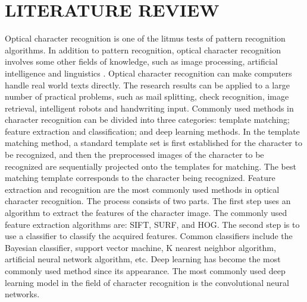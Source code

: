 \documentclass[a4paper,12pt]{report}
\begin{document}
\renewcommand\chaptername{CHAPTER}
\chapter{LITERATURE REVIEW}

Optical character recognition is one of the litmus tests of pattern recognition algorithms. In addition to pattern recognition, optical character recognition involves some other fields of knowledge, such as image processing, artificial intelligence and linguistics \cite{Jader,Goodfellow,Hu}. Optical character recognition can make computers handle real world texts directly. The research results can be applied to a large number of practical problems, such as mail splitting, check recognition, image retrieval, intelligent robots and handwriting input. Commonly used methods in character recognition can be divided into three categories: template matching; feature extraction and classification; and deep learning methods. In the template matching method, a standard template set is first established for the character to be recognized, and then the preprocessed images of the character to be recognized are sequentially projected onto the templates for matching. The best matching template corresponds to the character being recognized. Feature extraction and recognition are the most commonly used methods in optical character recognition. The process consists of two parts. The first step uses an algorithm to extract the features of the character image. The commonly used feature extraction algorithms are: SIFT, SURF, and HOG. The second step is to use a classifier to classify the acquired features. Common classifiers include the Bayesian classifier, support vector machine, K nearest neighbor algorithm, artificial neural network algorithm, etc. \cite{Nas} Deep learning has become the most commonly used method since its appearance. The most commonly used deep learning model in the field of character recognition is the convolutional neural networks.
\end{document}
